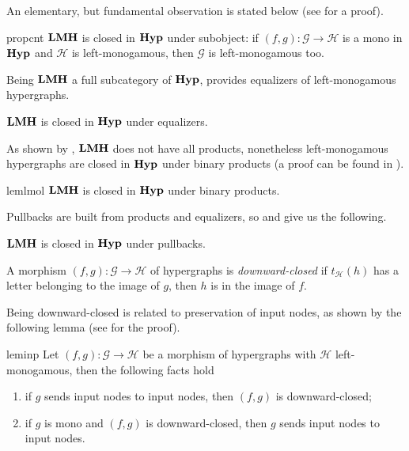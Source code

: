 \documentclass[3p]{elsarticle}
\newcommand{\catname}[1]{\textbf{\textup{#1}}}
\newcommand{\lmo}{\catname{LMH}}
\newcommand{\hyp}{\catname{Hyp}}
\theoremstyle{remark}
\theoremstyle{definition}
\begin{document}
An elementary, but fundamental observation is stated below (see  for a proof).

\begin{restatable}{prop}{cnt}\label{prop:count}
	$\lmo$ is closed in $\hyp$ under subobject: if $(f,g)\colon \mathcal{G}\to \mathcal{H}$ is a mono in $\hyp$ and $\mathcal{H}$ is left-monogamous, then $\mathcal{G}$ is left-monogamous too.
\end{restatable}

Being $\lmo$ a full subcategory of $\hyp$, 
 provides equalizers of left-monogamous hypergraphs.
\begin{cor}\label{cor:eq}
	$\lmo$ is closed in $\hyp$ under equalizers.
\end{cor}

As shown by , $\lmo$ does not have all products, nonetheless left-monogamous hypergraphs are closed in $\hyp$ under binary products (a proof can be found in ).

\begin{restatable}{lem}{lmol}\label{lem:pro}
	$\lmo$ is closed in $\hyp$ under binary products.
\end{restatable}

Pullbacks are built from products and equalizers, so   and  give us the following.

\begin{cor}\label{cor:pb}	$\lmo$ is closed in $\hyp$ under pullbacks.
\end{cor}


\begin{defi}
A morphism $(f,g)\colon \mathcal{G}\to \mathcal{H}$ of hypergraphs  is \emph{downward-closed} if  $t_{\mathcal{H}}(h)$ has a letter belonging to the image of $g$, then $h$ is in the image of $f$. 
\end{defi}

Being downward-closed is related to preservation of input nodes, as shown by the following lemma (see  for the proof).

\begin{restatable}{lem}{inp}\label{lem:inp}
	Let $(f,g)\colon \mathcal{G}\to \mathcal{H}$ be a morphism of hypergraphs with $\mathcal{H}$ left-monogamous, then the following facts hold
	\begin{enumerate}
		\item if $g$ sends input nodes to input nodes, then $(f,g)$ is downward-closed; 
		\item if $g$ is mono and $(f,g)$ is downward-closed, then $g$ sends input nodes to input nodes.
	\end{enumerate}
\end{restatable}
\end{document}
